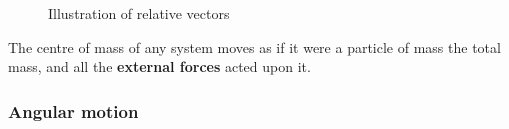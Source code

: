\documentclass[12pt, a4paper]{article}
\begin{document}
\begin{figure}[H]
    \begin{center}
        
    \end{center}
    \caption{Illustration of relative vectors}
\end{figure}

\begin{mdthm}
    The centre of mass of any system moves as if it were a particle of mass the total mass, and all the \textbf{external forces} acted upon it.
\end{mdthm}

\subsubsection{Angular motion}






\end{document}
